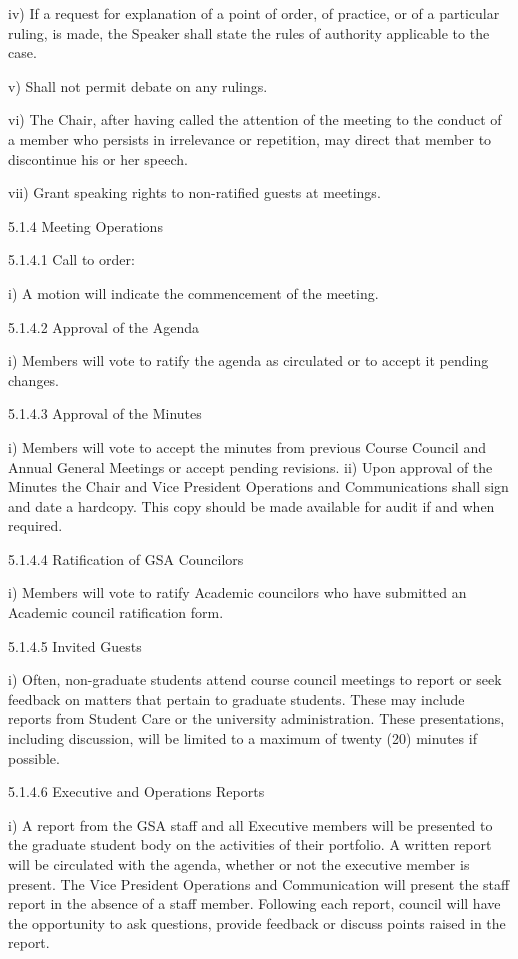  iv) If a request for explanation of a point of order, of practice, or of a 
 particular ruling, is made, the Speaker shall state the rules of 
 authority applicable to the case. 
 
 v) Shall not permit debate on any rulings. 
 
 vi) The Chair, after having called the attention of the meeting to the 
 conduct of a member who persists in irrelevance or repetition, may 
 direct that member to discontinue his or her speech. 
 
 vii) Grant speaking rights to non-ratified guests at meetings. 
 
 5.1.4 Meeting Operations 
 
 5.1.4.1 Call to order: 
 
 i) A motion will indicate the commencement of the meeting. 
 
 5.1.4.2 Approval of the Agenda 

 i) Members will vote to ratify the agenda as circulated or to accept it 
 pending changes. 
 
 5.1.4.3 Approval of the Minutes 
 
 i) Members will vote to accept the minutes from previous Course 
 Council and Annual General Meetings or accept pending revisions. 
 ii) Upon approval of the Minutes the Chair and Vice President 
 Operations and Communications shall sign and date a hardcopy. 
 This copy should be made available for audit if and when required. 
 
 5.1.4.4 Ratification of GSA Councilors 
 
 i) Members will vote to ratify Academic councilors who have 
 submitted an Academic council ratification form. 
 
 5.1.4.5 Invited Guests 
 
 i) Often, non-graduate students attend course council meetings to 
 report or seek feedback on matters that pertain to graduate 
 students. These may include reports from Student Care or the 
 university administration. These presentations, including 
 discussion, will be limited to a maximum of twenty (20) minutes if 
 possible. 
 
 5.1.4.6 Executive and Operations Reports 
 
 i) A report from the GSA staff and all Executive members will be 
 presented to the graduate student body on the activities of their 
 portfolio. A written report will be circulated with the agenda, 
 whether or not the executive member is present. The Vice 
 President Operations and Communication will present the staff 
 report in the absence of a staff member. Following each report, 
 council will have the opportunity to ask questions, provide 
 feedback or discuss points raised in the report. 
 

